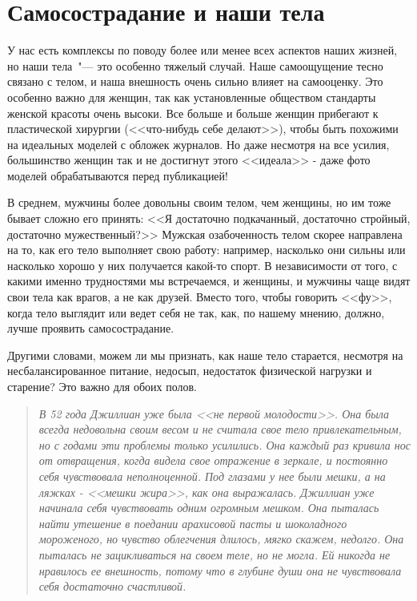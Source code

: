 
\chapter{Самосострадание и наши тела} \label{Self-Compassion_and_Our_Bodies}

У нас есть комплексы по поводу более или менее всех аспектов наших жизней, но наши тела~"--- это особенно тяжелый случай. Наше самоощущение тесно связано с телом, и наша внешность очень сильно влияет на самооценку. Это особенно важно для женщин, так как установленные обществом стандарты женской красоты очень высоки\cite{77}. Все больше и больше женщин прибегают к пластической хирургии (<<что-нибудь себе делают>>), чтобы быть похожими на идеальных моделей с обложек журналов. Но даже несмотря на все усилия, большинство женщин так и не достигнут этого <<идеала>> - даже фото моделей обрабатываются перед публикацией!

В среднем, мужчины более довольны своим телом, чем женщины, но им тоже бывает сложно его принять: <<Я достаточно подкачанный, достаточно стройный, достаточно мужественный?>> Мужская озабоченность телом скорее направлена на то, как его тело выполняет свою работу: например, насколько они сильны или насколько хорошо у них получается какой-то спорт. В независимости от того, с какими именно трудностями мы встречаемся, и женщины, и мужчины чаще видят свои тела как врагов, а не как друзей. Вместо того, чтобы говорить <<фу>>, когда тело выглядит или ведет себя не так, как, по нашему мнению, должно, лучше проявить самосострадание. 

Другими словами, можем ли мы признать, как наше тело старается, несмотря на несбалансированное питание, недосып, недостаток физической нагрузки и старение? Это важно для обоих полов. 

\begin{quotation}
	\textit{
		В 52 года Джиллиан уже была <<не первой молодости>>. Она была всегда недовольна своим весом и не считала свое тело привлекательным, но с годами эти проблемы только усилились. Она каждый раз кривила нос от отвращения, когда видела свое отражение в зеркале, и постоянно себя чувствовала неполноценной. Под глазами у нее были мешки, а на ляжках - <<мешки жира>>, как она выражалась. Джиллиан уже начинала себя чувствовать одним огромным мешком. Она пыталась найти утешение в поедании арахисовой пасты и шоколадного мороженого, но чувство облегчения длилось, мягко скажем, недолго. Она пыталась не зацикливаться на своем теле, но не могла. Ей никогда не нравилось ее внешность, потому что в глубине души она не чувствовала себя достаточно счастливой.
	}
\end{quotation}

